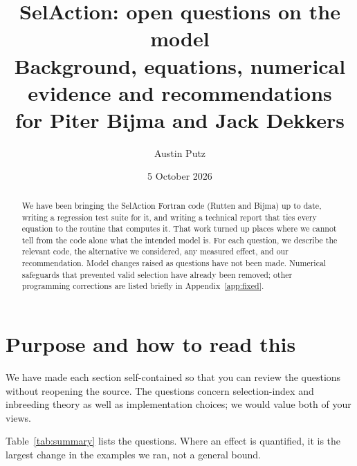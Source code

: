 \documentclass[11pt]{article}
\title{SelAction: open questions on the model\\[4pt]
\large Background, equations, numerical evidence and recommendations\\
for Piter Bijma and Jack Dekkers}
\author{Austin Putz}
\date{5 October 2026}
\begin{document}
\maketitle

\begin{abstract}
We have been bringing the SelAction Fortran code (Rutten and Bijma) up to date, writing a regression test suite for it, and writing a technical report that ties every equation to the routine that computes it. That work turned up places where we cannot tell from the code alone what the intended model is. For each question, we describe the relevant code, the alternative we considered, any measured effect, and our recommendation. Model changes raised as questions have not been made. Numerical safeguards that prevented valid selection have already been removed; other programming corrections are listed briefly in Appendix~\ref{app:fixed}.
\end{abstract}

\tableofcontents

\section{Purpose and how to read this}

We have made each section self-contained so that you can review the questions without reopening the source. The questions concern selection-index and inbreeding theory as well as implementation choices; we would value both of your views.

Table~\ref{tab:summary} lists the questions. Where an effect is quantified, it is the largest change in the examples we ran, not a general bound.
\end{document}
